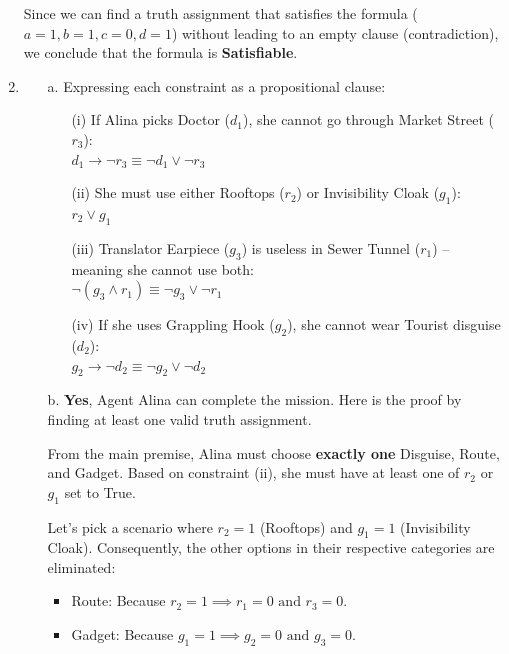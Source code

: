 \documentclass[a4paper]{article}
\theoremstyle{definition}
\begin{document}
\begin{enumerate}
        Since we can find a truth assignment that satisfies the formula ($a = 1, b = 1, c = 0, d = 1$) without leading to an empty clause (contradiction), we conclude that the formula is \textbf{Satisfiable}.

  \item \begin{enumerate}
          \item[a.] Expressing each constraint as a propositional clause:
                \begin{itemize}
                  \item[(i)] If Alina picks Doctor ($d_1$), she cannot go through Market Street ($r_3$): \\ $d_1 \to \neg r_3 \equiv \neg d_1 \lor \neg r_3$
                  \item[(ii)] She must use either Rooftops ($r_2$) or Invisibility Cloak ($g_1$): \\ $r_2 \lor g_1$
                  \item[(iii)] Translator Earpiece ($g_3$) is useless in Sewer Tunnel ($r_1$) -- meaning she cannot use both: \\ $\neg (g_3 \land r_1) \equiv \neg g_3 \lor \neg r_1$
                  \item[(iv)] If she uses Grappling Hook ($g_2$), she cannot wear Tourist disguise ($d_2$): \\ $g_2 \to \neg d_2 \equiv \neg g_2 \lor \neg d_2$
                \end{itemize}

          \item[b.] \textbf{Yes}, Agent Alina can complete the mission. Here is the proof by finding at least one valid truth assignment.

                From the main premise, Alina must choose \textbf{exactly one} Disguise, Route, and Gadget.
                Based on constraint (ii), she must have at least one of $r_2$ or $g_1$ set to True.

                Let's pick a scenario where $r_2 = 1$ (Rooftops) and $g_1 = 1$ (Invisibility Cloak). Consequently, the other options in their respective categories are eliminated:
                \begin{itemize}
                  \item Route: Because $r_2 = 1 \implies r_1 = 0 \text{ and } r_3 = 0$.
                  \item Gadget: Because $g_1 = 1 \implies g_2 = 0 \text{ and } g_3 = 0$.
                \end{itemize}


\end{enumerate}
\end{enumerate}
\end{document}
